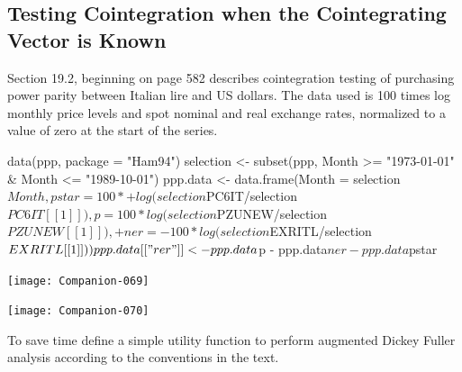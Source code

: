 \documentclass[a4paper]{article}
\begin{document}
\subsection{Testing Cointegration when the Cointegrating Vector is Known}
Section 19.2, beginning on page 582 describes cointegration testing of purchasing power parity between
Italian lire and US dollars.  The data used is 100 times log monthly price levels and spot nominal and real
exchange rates, normalized to a value of zero at the start of the series.  
\begin{Schunk}
\begin{Sinput}
 data(ppp, package = "Ham94")
 selection <- subset(ppp, Month >= "1973-01-01" & Month <= "1989-10-01")
 ppp.data <- data.frame(Month = selection$Month, pstar = 100 * 
+     log(selection$PC6IT/selection$PC6IT[[1]]), p = 100 * log(selection$PZUNEW/selection$PZUNEW[[1]]), 
+     ner = -100 * log(selection$EXRITL/selection$EXRITL[[1]]))
 ppp.data[["rer"]] <- ppp.data$p - ppp.data$ner - ppp.data$pstar
\end{Sinput}
\end{Schunk}
\begin{center}
\texttt{[image: Companion-069]}
\end{center}
\begin{center}
\texttt{[image: Companion-070]}
\end{center}
To save time define a simple utility function to perform augmented Dickey Fuller analysis according to
the conventions in the text.
\begin{Schunk}
\end{Schunk}
\end{document}
